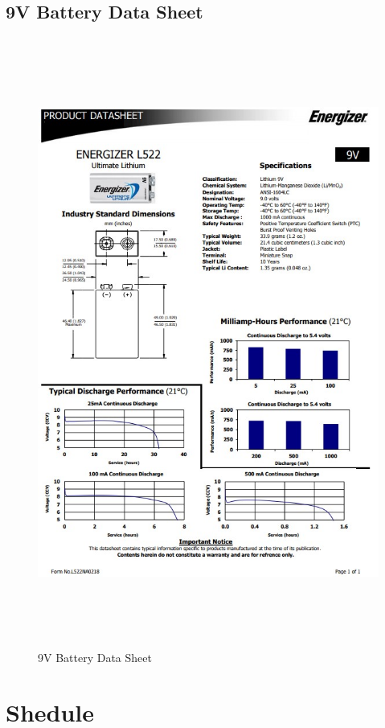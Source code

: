 \documentclass[12pt]{article}
\begin{document}
{{{{		\subsection{9V Battery Data Sheet}
			\begin{figure}[ht!]
				\centering
				\includegraphics[height=200mm]{assets/9V_Battery_DataSheet.jpg}
				\caption{9V Battery Data Sheet \label{overflow}}
			\end{figure}
	
	\clearpage
	
	\section{Shedule}
	
}}}}
\end{document}
